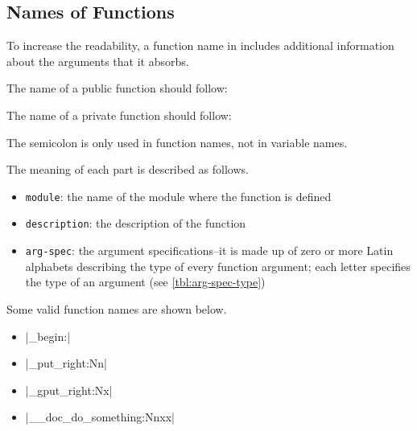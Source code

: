 \documentclass{ltugboat}
\begin{document}
\subsection{Names of Functions}

To increase the readability, a function name in \LTT{} includes additional information about the arguments that it absorbs. 

\vspace*{0.5\baselineskip}
\par\noindent
The name of a public \LTT{} function should follow:
\begin{center}
\end{center}
The name of a private \LTT{} function should follow:
\begin{center}
\end{center}
The semicolon is only used in \LTT{} function names, not in variable names.

\vspace*{0.5\baselineskip}
\par\noindent
The meaning of each part is described as follows.
\begin{itemize}
\item \texttt{module}: the name of the module where the function is defined
\item \texttt{description}: the description of the function
\item \texttt{arg-spec}: the argument specifications--it is made up of zero or more Latin alphabets describing the type of every function argument; each letter specifies the type of an argument (see \cref{tbl:arg-spec-type})
\end{itemize}
Some valid function names are shown below.
\begin{itemize}
\item \inltex|\group_begin:|
\item \inltex|\tl_put_right:Nn|
\item \inltex|\tl_gput_right:Nx|
\item \inltex|\__doc_do_something:Nnxx|
\end{itemize}
\end{document}

